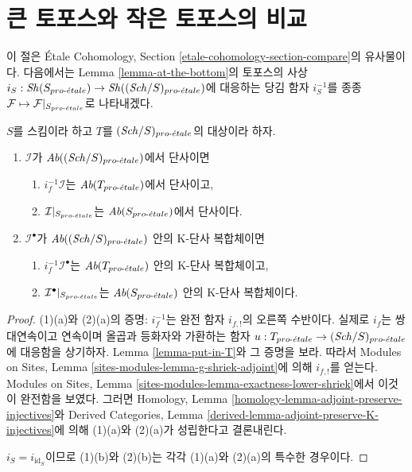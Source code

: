 \section{큰 토포스와 작은 토포스의 비교}
\label{section-compare}

\noindent
이 절은 \'Etale Cohomology, Section
\ref{etale-cohomology-section-compare}의 유사물이다. 다음에서는 Lemma
\ref{lemma-at-the-bottom}의 토포스의 사상
$i_S : \mathop{\mathit{Sh}}\nolimits(S_{pro\text{-}\acute{e}tale}) \to \mathop{\mathit{Sh}}\nolimits((\mathit{Sch}/S)_{pro\text{-}\acute{e}tale})$에 대응하는 당김
함자 $i_S^{-1}$를 종종
$\mathcal{F} \mapsto \mathcal{F}|_{S_{pro\text{-}\acute{e}tale}}$로 나타내겠다.

\begin{lemma}
\label{lemma-compare-injectives}
$S$를 스킴이라 하고 $T$를 $(\mathit{Sch}/S)_{pro\text{-}\acute{e}tale}$의 대상이라 하자.
\begin{enumerate}
\item $\mathcal{I}$가 $\textit{Ab}((\mathit{Sch}/S)_{pro\text{-}\acute{e}tale})$에서 단사이면
\begin{enumerate}
\item $i_f^{-1}\mathcal{I}$는 $\textit{Ab}(T_{pro\text{-}\acute{e}tale})$에서 단사이고,
\item $\mathcal{I}|_{S_{pro\text{-}\acute{e}tale}}$는
$\textit{Ab}(S_{pro\text{-}\acute{e}tale})$에서 단사이다.
\end{enumerate}
\item $\mathcal{I}^\bullet$가 $\textit{Ab}((\mathit{Sch}/S)_{pro\text{-}\acute{e}tale})$ 안의
K-단사 복합체이면
\begin{enumerate}
\item $i_f^{-1}\mathcal{I}^\bullet$는
$\textit{Ab}(T_{pro\text{-}\acute{e}tale})$ 안의 K-단사 복합체이고,
\item $\mathcal{I}^\bullet|_{S_{pro\text{-}\acute{e}tale}}$는
$\textit{Ab}(S_{pro\text{-}\acute{e}tale})$ 안의 K-단사 복합체이다.
\end{enumerate}
\end{enumerate}
\end{lemma}

\begin{proof}
(1)(a)와 (2)(a)의 증명: $i_f^{-1}$는 완전 함자 $i_{f, !}$의 오른쪽
수반이다. 실제로 $i_f$는 쌍대연속이고 연속이며 올곱과 등화자와
가환하는 함자 $u : T_{pro\text{-}\acute{e}tale} \to (\mathit{Sch}/S)_{pro\text{-}\acute{e}tale}$에 대응함을
상기하자. Lemma \ref{lemma-put-in-T}와 그 증명을 보라. 따라서 Modules
on Sites, Lemma \ref{sites-modules-lemma-g-shriek-adjoint}에 의해
$i_{f, !}$를 얻는다. Modules on Sites, Lemma
\ref{sites-modules-lemma-exactness-lower-shriek}에서 이것이 완전함을
보였다. 그러면 Homology, Lemma
\ref{homology-lemma-adjoint-preserve-injectives}와 Derived Categories,
Lemma \ref{derived-lemma-adjoint-preserve-K-injectives}에 의해 (1)(a)와
(2)(a)가 성립한다고 결론내린다.

\medskip\noindent
$i_S = i_{\text{id}_S}$이므로 (1)(b)와 (2)(b)는 각각 (1)(a)와
(2)(a)의 특수한 경우이다.
\end{proof}

